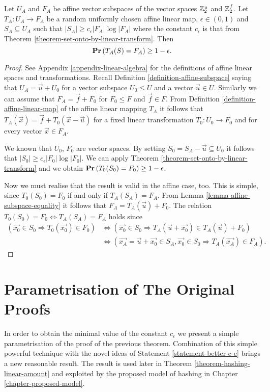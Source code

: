 \begin{corollary}
\label{corollary-affine-e2}
Let $U_A$ and $F_A$ be affine vector subspaces of the vector spaces $\mathbb{Z}_{2}^{u}$ and $\mathbb{Z}_{2}^{f}$. Let $T_A: U_A \rightarrow F_A$ be a random uniformly chosen affine linear map, $\epsilon \in (0, 1)$ and $S_A \subseteq U_A$ such that $|S_A| \geq c_\epsilon |F_A| \log |F_A|$ where the constant $c_{\epsilon}$ is that from Theorem \ref{theorem-set-onto-by-linear-transform}. Then
\[
	\mathbf{Pr}\left(T_A(S) = F_A\right) \geq 1 - \epsilon \text{.}
\]
\end{corollary}
\begin{proof}
See Appendix \ref{appendix-linear-algebra} for the definitions of affine linear spaces and transformations. Recall Definition \ref{definition-affine-subspace} saying that $U_A = \vec{u} + U_0$ for a vector subspace $U_0 \leq U$ and a vector $\vec{u} \in U$. Similarly we can assume that $F_A = \vec{f} + F_0$ for $F_0 \leq F$ and $\vec{f} \in F$. From Definition \ref{definition-affine-linear-map} of the affine linear mapping $T_A$ it follows that $T_A(\vec{x}) = \vec{f} + T_0(\vec{x} - \vec{u})$ for a fixed linear transformation $T_0: U_0 \rightarrow F_0$ and for every vector $\vec{x} \in F_A$.

We known that $U_0$, $F_0$ are vector spaces. By setting $S_0 = S_A - \vec{u} \subseteq U_0$ it follows that $|S_0| \geq c_\epsilon |F_0| \log |F_0|$. We can apply Theorem \ref{theorem-set-onto-by-linear-transform} and we obtain $\mathbf{Pr}\left(T_0(S_0) = F_0\right) \geq 1 - \epsilon$.

Now we must realise that the result is valid in the affine case, too. This is simple, since $T_0(S_0) = F_0$ if and only if $T_A(S_A) = F_A$. From Lemma \ref{lemma-affine-subspace-equality} it follows that $F_A = T_A(\vec{u}) + F_0$. The relation $T_0(S_0) = F_0 \Leftrightarrow T_A(S_A) = F_A$ holds since
\[
\begin{split}
(\vec{x_0} \in S_0 \Rightarrow T_0(\vec{x_0}) \in F_0) 
	& \Leftrightarrow (\vec{x_0} \in S_0 \Rightarrow T_A(\vec{u} + \vec{x_0}) \in T_A(\vec{u}) + F_0) \\
	& \Leftrightarrow (\vec{x_A} = \vec{u} + \vec{x_0} \in S_A, \vec{x_0} \in S_0 \Rightarrow T_A(\vec{x_A}) \in F_A) \text{.}
\end{split}
\]
\end{proof}

\section{Parametrisation of The Original Proofs}
In order to obtain the minimal value of the constant $c_\epsilon$ we present a simple parametrisation of the proof of the previous theorem. Combination of this simple powerful technique with the novel ideas of Statement \ref{statement-better-c-e} brings a new reasonable result. The result is used later in Theorem \ref{theorem-hashing-linear-amount} and exploited by the proposed model of hashing in Chapter \ref{chapter-proposed-model}.

